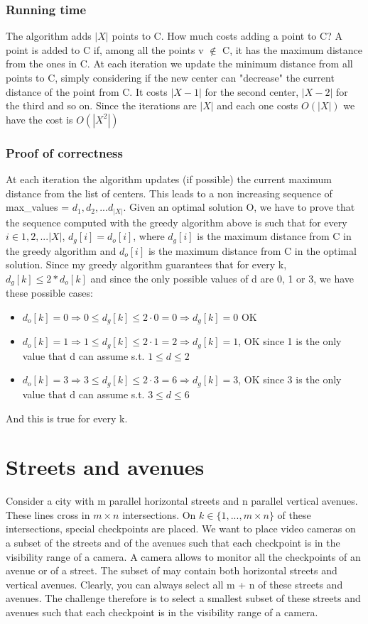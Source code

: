 \documentclass[12pt]{article}
\begin{document}
\subsubsection{Running time}
The algorithm adds $|X|$ points to C. How much costs adding a point to C? A point is added to C if, among all the points v $\notin$ C, it has the maximum distance from the ones in C. At each iteration we update the minimum distance from all points to C, simply considering if the new center can "decrease" the current distance of the point from C. It costs $|X - 1|$ for the second center, $|X - 2|$ for the third and so on. Since the iterations are $|X|$ and each one costs $O(|X|)$ we have the cost is $O(|X^2|)$
\subsubsection{Proof of correctness}
At each iteration the algorithm updates (if possible) the current maximum distance from the list of centers. This leads to a non increasing sequence of max\_values = ${d_1, d_2, ... d_{|X|}}$. Given an optimal solution O, we have to prove that the sequence computed with the greedy algorithm above is such that for every $i \in {1, 2, ... |X|}$, $d_g[i] = d_o[i] $, where $d_g[i]$ is the maximum distance from C in the greedy algorithm and $d_o[i]$ is the maximum distance from C in the optimal solution. Since my greedy algorithm guarantees that for every k, $d_g[k] \leq 2* d_o[k]$ and since the only possible values of d are 0, 1 or 3, we have these possible cases:
\begin{itemize}
	\item $d_o[k] = 0 \Rightarrow  0 \leq d_g[k] \leq 2\cdot0 = 0 \Rightarrow d_g[k] = 0$ OK
	\item $d_o[k] = 1 \Rightarrow  1 \leq d_g[k] \leq 2\cdot1 = 2 \Rightarrow d_g[k] = 1 $, OK since 1 is the only value that d can assume s.t. $1 \leq d \leq 2$
	\item $d_o[k] = 3 \Rightarrow  3 \leq d_g[k] \leq 2\cdot3 = 6 \Rightarrow d_g[k] = 3 $, OK since 3 is the only value that d can assume s.t. $3 \leq d \leq 6$
\end{itemize}
And this is true for every k.

\section{Streets and avenues}
Consider a city with m parallel horizontal streets and n parallel vertical avenues.
These lines cross in $m \times n$ intersections. On $k \in \{1, ... ,m \times n\}$ of these intersections, special checkpoints are placed. We want to place video cameras on a subset of the streets and of the avenues such that each checkpoint is in the visibility range of a camera. A camera allows to monitor all the checkpoints of an avenue or of a street. The subset of may contain both
horizontal streets and vertical avenues. Clearly, you can always select all m + n of these streets and avenues. The challenge therefore is to select a smallest subset of these streets and avenues such that each checkpoint is in the visibility range of a camera.
\end{document}
